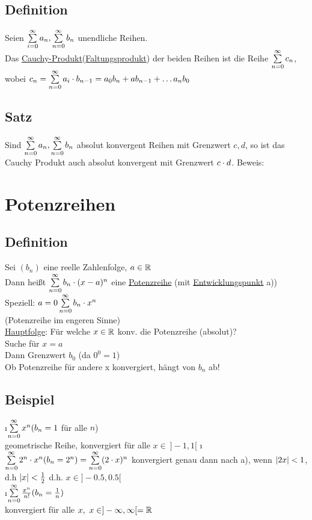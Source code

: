 \subsection{Definition}
Seien $ \sum\limits_{i=0}^{\infty} a_n, \sum\limits_{n=0}^{\infty} b_n$ unendliche Reihen.\\
Das \underline{Cauchy-Produkt}(\underline{Faltungsprodukt}) der beiden Reihen ist die Reihe $\sum\limits_{n=0}^{\infty} c_n$, wobei $c_n = \sum\limits_{n=0}^{\infty} a_i \cdot b_{n-1} = a_0b_n + ab_{n-1} + \ldots a_nb_0$
\subsection[Satz: Konvergenz im Cauchy Produkt]{Satz}
Sind $\sum\limits_{n=0}^{\infty} a_n, \sum\limits_{n=0}^{\infty} b_n$ absolut konvergent Reihen mit Grenzwert $c ,d$, so ist das Cauchy Produkt auch absolut konvergent mit Grenzwert $c \cdot d$. \hfill
Beweis: \cite{k1}

\section{Potenzreihen}
\subsection{Definition}
Sei $(b_n)$ eine reelle Zahlenfolge, $a \in \mathbb{R}$\\
Dann hei\ss t $\sum\limits_{n=0}^{\infty} b_n \cdot (x-a)^n$ eine \underline{Potenzreihe} (mit \underline{Entwicklungspunkt} a))
Speziell: $a=0\\
\sum\limits_{n = 0}^{\infty} b_n \cdot x^n$\\
(Potenzreihe im engeren Sinne)\\
\underline{Hauptfolge}: Für welche $x \in \mathbb{R}$ konv. die Potenzreihe (absolut)?\\
Suche für $x=a$\\
Dann Grenzwert $b_ 0$ (da $0^0 = 1$)\\
Ob Potenzreihe für andere x konvergiert, hängt von $b_n$ ab!
\subsection{Beispiel} 
\begin{enumerate}[a)]
\i $\sum\limits_{n=0}^{\infty} x^n (b_n =1$ für alle $n$)\\
geometrische Reihe, konvergiert für alle $x \in \  ]-1,1[$
\i $\sum\limits_{n=0}^{\infty} 2^n \cdot x^n (b_n = 2^n) = \sum\limits_{n=0}^{\infty} (2 \cdot x)^n$
konvergiert genau dann nach a), wenn $\lvert 2x \rvert < 1$, d.h $\lvert x \rvert < \frac{1}{2}$ d.h. $x \in ]-0.5, 0.5[$\\
\i $\sum\limits_{n=0}^{\infty} \frac{x^n}{n!} (b_n = \frac{1}{n})$\\
konvergiert für alle $x, \ x \in ]-\infty,\infty[ = \mathbb{R} $\\
\end{enumerate}
